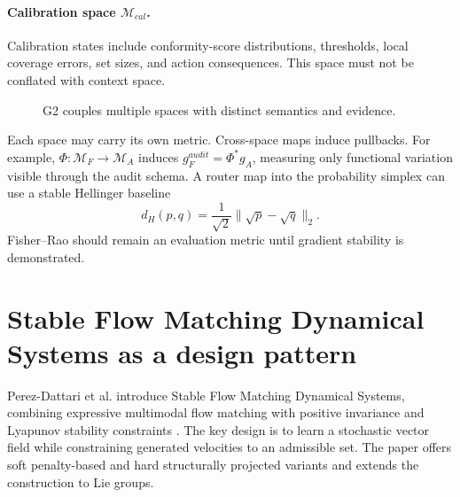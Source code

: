 \documentclass[11pt,a4paper]{article}
\newcommand{\M}{\mathcal{M}}
\begin{document}
\paragraph{Calibration space $\M_{cal}$.} Calibration states include conformity-score distributions, thresholds, local coverage errors, set sizes, and action consequences. This space must not be conflated with context space.

\begin{figure}[ht]
\centering
{}
\caption{G2 couples multiple spaces with distinct semantics and evidence.}
\end{figure}

Each space may carry its own metric. Cross-space maps induce pullbacks. For example, $\Phi:\M_F\to\M_A$ induces $g_F^{audit}=\Phi^*g_A$, measuring only functional variation visible through the audit schema. A router map into the probability simplex can use a stable Hellinger baseline
\begin{equation}
d_H(p,q)=\frac{1}{\sqrt{2}}\lVert\sqrt{p}-\sqrt{q}\rVert_2.
\end{equation}
Fisher--Rao should remain an evaluation metric until gradient stability is demonstrated.

\section{Stable Flow Matching Dynamical Systems as a design pattern}
Perez-Dattari et al. introduce Stable Flow Matching Dynamical Systems, combining expressive multimodal flow matching with positive invariance and Lyapunov stability constraints \cite{perezdattari2026sfmds,lipman2023flow}. The key design is to learn a stochastic vector field while constraining generated velocities to an admissible set. The paper offers soft penalty-based and hard structurally projected variants and extends the construction to Lie groups.
\end{document}
